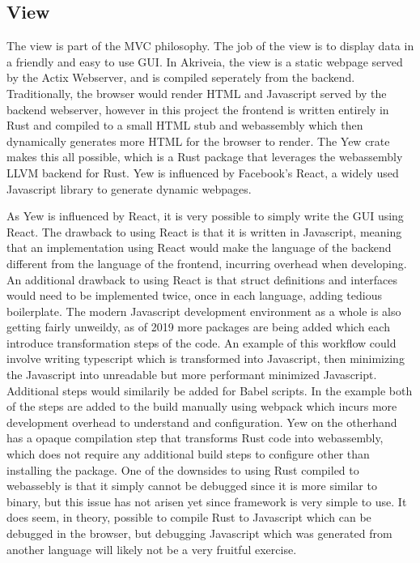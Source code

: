 \subsection{View}
\medskip
\label{view_section}
The view is part of the MVC philosophy.
The job of the view is to display data in a friendly and easy to use GUI.
In Akriveia, the view is a static webpage served by the Actix Webserver, and is compiled seperately from the backend.
Traditionally, the browser would render HTML and Javascript served by the backend webserver, however in this project the frontend is written entirely in Rust and compiled to a small HTML stub and webassembly which then dynamically generates more HTML for the browser to render.
The Yew crate makes this all possible, which is a Rust package that leverages the webassembly LLVM backend for Rust.
Yew is influenced by Facebook's \Gls{React}, a widely used Javascript library to generate dynamic webpages.

\bigskip
As Yew is influenced by React, it is very possible to simply write the GUI using React.
The drawback to using React is that it is written in Javascript, meaning that an implementation using React would make the language of the backend different from the language of the frontend, incurring overhead when developing.
An additional drawback to using React is that struct definitions and interfaces would need to be implemented twice, once in each language, adding tedious boilerplate.
The modern Javascript development environment as a whole is also getting fairly unweildy, as of 2019 more packages are being added which each introduce transformation steps of the code.
An example of this workflow could involve writing typescript which is transformed into Javascript, then minimizing the Javascript into unreadable but more performant minimized Javascript.
Additional steps would similarily be added for \Gls{Babel} scripts.
In the example both of the steps are added to the build manually using webpack which incurs more development overhead to understand and configuration.
Yew on the otherhand has a opaque compilation step that transforms Rust code into webassembly, which does not require any additional build steps to configure other than installing the package.
One of the downsides to using Rust compiled to webassebly is that it simply cannot be debugged since it is more similar to binary, but this issue has not arisen yet since framework is very simple to use.
It does seem, in theory, possible to compile Rust to Javascript which can be debugged in the browser, but debugging Javascript which was generated from another language will likely not be a very fruitful exercise.

